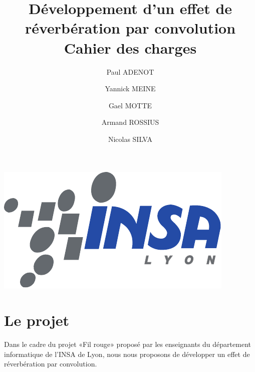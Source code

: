 


\author{Paul ADENOT \and Yannick MEINE \and Gael MOTTE \and Armand ROSSIUS \and Nicolas SILVA }
\title{Développement d'un effet de réverbération par convolution\\Cahier des charges}



	\maketitle
	\tableofcontents

	\vspace{2cm}

	\begin{center}
		\includegraphics{insalogo.pdf}
	\end{center}

	\newpage

	\section{Le projet}
		Dans le cadre du projet «Fil rouge» proposé par les enseignants du département informatique de l'INSA de Lyon, nous nous proposons de développer un effet de réverbération par convolution.

